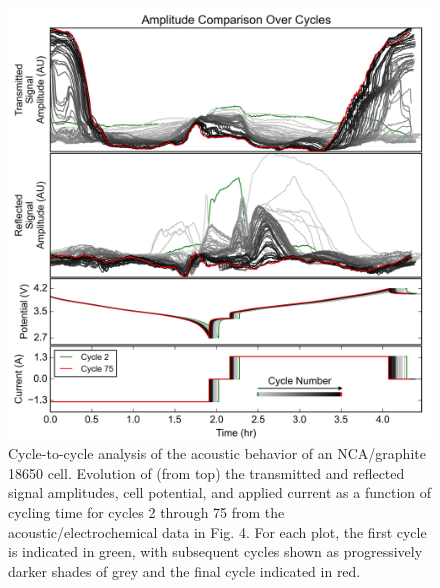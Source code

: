 \begin{figure}[htb]
  \centering
    \includegraphics[width=\textwidth]{ch4-bw/images/ncacycle.png}
    \caption[Cycle-to-cycle analysis of the acoustic behavior of an NCA/graphite 18650 cell.]{Cycle-to-cycle analysis of the acoustic behavior of an NCA/graphite 18650 cell. Evolution of (from top) the transmitted and reflected signal amplitudes, cell potential, and applied current as a function of cycling time for cycles 2 through 75 from the acoustic/electrochemical data in Fig. 4. For each plot, the first cycle is indicated in green, with subsequent cycles shown as progressively darker shades of grey and the final cycle indicated in red.}
    \label{fig:ncacycle}
\end{figure}

\clearpage

